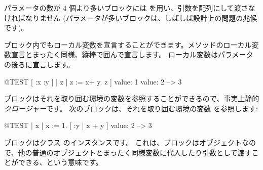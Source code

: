 \documentclass[a4paper,10pt,twoside]{book}
\begin{document}
パラメータの数が 4 個より多いブロックには  を用い、引数を配列にして渡さなければなりません
(パラメータが多いブロックは、しばしば設計上の問題の兆候です)。

ブロック内でもローカル変数を宣言することができます。メソッドのローカル変数宣言とまったく同様、縦棒で囲んで宣言します。
ローカル変数はパラメータの後ろに宣言します。

\begin{code}{@TEST}
[ :x :y | | z | z := x+ y. z ] value: 1 value: 2 --> 3
\end{code}

ブロックはそれを取り囲む環境の変数を参照することができるので、事実上静的\emph{クロージャー}です。
次のブロックは、それを取り囲む環境の変数  を参照します:

\begin{code}{@TEST}
| x |
x := 1.
[ :y | x + y ] value: 2 --> 3
\end{code}

ブロックはクラス  のインスタンスです。
これは、ブロックはオブジェクトなので、他の普通のオブジェクトとまったく同様変数に代入したり引数として渡すことができる、という意味です。




\end{document}
